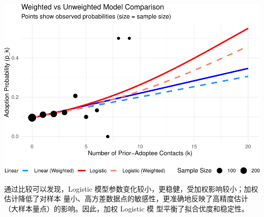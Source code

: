 \documentclass[
]{article}
\begin{document}
\includegraphics{Homework-04_files/figure-latex/unnamed-chunk-10-1.pdf}

通过比较可以发现，Logistic
模型参数变化较小，更稳健，受加权影响较小；加权估计降低了对样本
量小、高方差数据点的敏感性，更准确地反映了高精度估计（大样本量点）的影响。因此，加权
Logistic 模 型平衡了拟合优度和稳定性。
\end{document}
